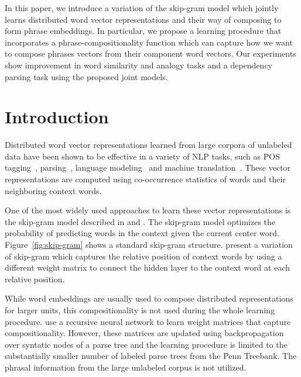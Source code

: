 In this paper, we introduce a variation of the skip-gram model which jointly learns 
distributed word vector representations and their way of composing to form phrase embeddings.
In particular, we propose a learning procedure that incorporates a phrase-compositionality
function which can capture how we want to compose phrases vectors from their component
word vectors. Our experiments show improvement in word similarity and analogy tasks and a dependency 
parsing task using the proposed joint models.
\section{Introduction}
Distributed word vector representations learned from large corpora of unlabeled data have been shown to be effective in
a variety of NLP tasks, such as POS tagging~\cite{collobert2011scratch}, parsing~\cite{chen2014fast,DurrettKlein2015}, 
language modeling~\cite{bengio2003neural,mnih2007three} and machine translation~\cite{devlin-EtAl:2014:P14-1,liu-EtAl:2014:P14-1,sutskever2014sequence,kalchbrenner2013recurrent}.
These vector representations are computed using co-occurrence statistics of words and their neighboring context words.


One of the most widely used approaches to learn these vector representations is the skip-gram model described in  and . 
The skip-gram model optimizes the probability of predicting words in the context given the current center word.  
Figure~\ref{fig:skip-gram} shows a standard skip-gram structure. 
 present a variation of skip-gram which captures the relative position of context words
by using a different weight matrix to connect the hidden layer to the context word at each relative position. 


While word embeddings are usually used to compose distributed representations for larger units,
this compositionality is not used during the whole learning procedure.  use a recursive neural network
to learn weight matrices that capture compositionality.
However, these matrices are updated using backpropagation over syntatic nodes of a parse tree and the
learning procedure is limited to the substantially 
smaller number of labeled parse trees from the Penn Treebank. The phrasal information from the large unlabeled corpus is not utilized.


